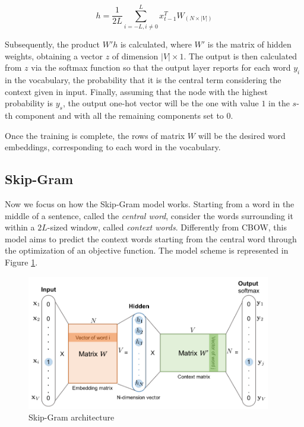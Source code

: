 \[
h = \frac{1}{2L}\sum_{i=-L, i \neq 0}^{L} x_{t-1}^{T} W_{(N \times |V|)}
\]

Subsequently, the product $W'h$ is calculated, where $W'$ is the matrix of hidden weights, obtaining a vector $z$ of dimension $|V| \times 1$. The output is then calculated from $z$ via the softmax function so that the output layer reports for each word $y_i$ in the vocabulary, the probability that it is the central term considering the context given in input. Finally, assuming that the node with the highest probability is $y_s$, the output one-hot vector will be the one with value $1$ in the $s$-th component and with all the remaining components set to 0.



Once the training is complete, the rows of matrix $W$ will be the desired word embeddings, corresponding to each word in the vocabulary.


\subsection{Skip-Gram}

Now we focus on how the Skip-Gram model works. Starting from a word in the middle of a sentence, called the \textit{central word}, consider the words surrounding it within a $2L$-sized window, called \textit{context words}. Differently from \ac{CBOW}, this model aims to predict the context words starting from the central word through the optimization of an objective function. The model scheme is represented in Figure \ref{fig:g3}.

\begin{figure}[h]
    \centering
    \includegraphics[width=0.95\textwidth]{img/g3.PNG}
    \caption{Skip-Gram architecture}
    \label{fig:g3}
\end{figure}

